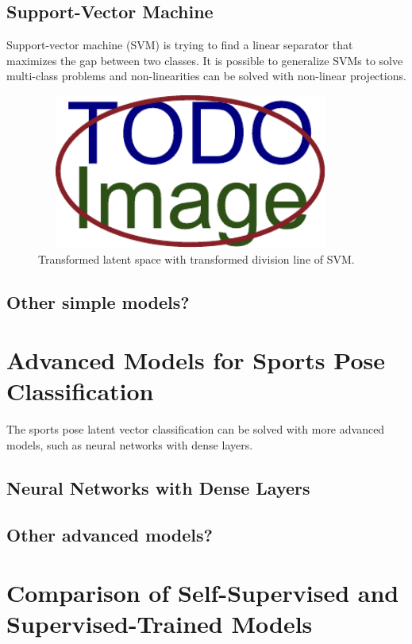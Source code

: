 \subsection{Support-Vector Machine}

Support-vector machine (SVM) is trying to find a linear separator that maximizes the gap between two classes. It is possible to generalize SVMs to solve multi-class problems and non-linearities can be solved with non-linear projections.
\blindtext

\blindtext

\blindtext

\begin{figure}[ht]\centering
  \centering
  \includegraphics[width=4in,height=2in]{figures/placeholder.pdf}
  \caption{Transformed latent space with transformed division line of SVM.}
  \label{SVM}
\end{figure}

\blindtext

\subsection{Other simple models?}

\blindtext

\blindtext

\blindtext

\section{Advanced Models for Sports Pose Classification}

The sports pose latent vector classification can be solved with more advanced models, such as neural networks with dense layers.
\blindtext

\blindtext

\subsection{Neural Networks with Dense Layers}

\blindtext

\blindtext

\subsection{Other advanced models?}

\blindtext

\blindtext

\blindtext

\section{Comparison of Self-Supervised and Supervised-Trained Models}

\blindtext

\blindtext

\blindtext

